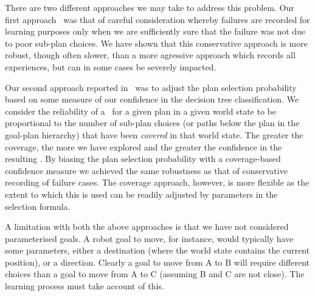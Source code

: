 
There are two different approaches we may take to address this
problem. Our first approach~\cite{Airiau:IJAT:09} was that of careful
consideration whereby failures are recorded for learning purposes only 
when we are sufficiently sure that the failure was not due to poor
sub-plan choices. 
We have shown that this conservative approach is more robust, 
though often slower, than a more agressive
approach which records all experiences, but can in some cases be
severely impacted.

Our second approach reported in~\cite{Singh:AAMAS10} was to
adjust the plan selection probability based on some measure of 
our confidence in the decision tree classification.
%
We consider the reliability of a \dt\ for a given plan in a given 
world state to be proportional to the number of sub-plan choices (or paths
below the plan in the goal-plan hierarchy) that have been \textit{covered} in that 
world state. The greater the coverage, the more we have explored and the
greater the confidence in the resulting \dt.
%
By biasing the plan selection probability with a coverage-based confidence
measure we achieved the same robustness as that of conservative recording of 
failure cases. The coverage approach, however, is more 
flexible as the extent to which this is used can be
readily adjusted by parameters in the selection formula. 

A limitation with both the above
approaches is that we have not considered parameterised goals. 
A robot goal to move, for instance, 
would typically have some parameters, either a destination (where the
world state contains the current position), or a direction. Clearly a
goal to move from A to B will require different choices than a goal to
move from A to C (assuming B and C are not close). The learning
process must take account of this.  

